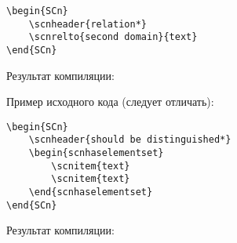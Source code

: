 \begin{lstlisting}
\begin{SCn}
	\scnheader{relation*}
	\scnrelto{second domain}{text}
\end{SCn}
\end{lstlisting}

Результат компиляции:

\begin{SCn}
\end{SCn}

Пример исходного кода (следует отличать):

\begin{lstlisting}
\begin{SCn}
	\scnheader{should be distinguished*}
	\begin{scnhaselementset}
		\scnitem{text}
		\scnitem{text}
	\end{scnhaselementset}
\end{SCn}
\end{lstlisting}

Результат компиляции:

\begin{SCn}
	\begin{scnhaselementset}
	\end{scnhaselementset}
\end{SCn}
	
\newpage

